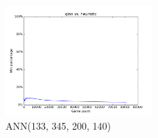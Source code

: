 \begin{figure}
  \vspace*{-0.00cm}
  \centering
  \includegraphics[width=0.50\textwidth]{4_133_345_140.png}
  \vspace*{-0.60cm}
  \caption{ANN(133, 345, 200, 140)}
  \label{fig:p3}
  \vspace*{-0.00cm}
\end{figure}

